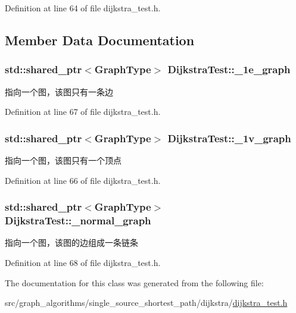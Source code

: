 Definition at line 64 of file dijkstra\+\_\+test.\+h.



\subsection{Member Data Documentation}
\hypertarget{class_dijkstra_test_ac99e2d7d0096e66a7abf7f1275b3a39a}{}
\subsubsection[{\+\_\+1e\+\_\+graph}]{\setlength{\rightskip}{0pt plus 5cm}std\+::shared\+\_\+ptr$<${\bf Graph\+Type}$>$ Dijkstra\+Test\+::\+\_\+1e\+\_\+graph\hspace{0.3cm}{\ttfamily [protected]}}\label{class_dijkstra_test_ac99e2d7d0096e66a7abf7f1275b3a39a}
指向一个图，该图只有一条边 

Definition at line 67 of file dijkstra\+\_\+test.\+h.

\hypertarget{class_dijkstra_test_ad7c2ba728d52c2265fd629da2c9a383c}{}
\subsubsection[{\+\_\+1v\+\_\+graph}]{\setlength{\rightskip}{0pt plus 5cm}std\+::shared\+\_\+ptr$<${\bf Graph\+Type}$>$ Dijkstra\+Test\+::\+\_\+1v\+\_\+graph\hspace{0.3cm}{\ttfamily [protected]}}\label{class_dijkstra_test_ad7c2ba728d52c2265fd629da2c9a383c}
指向一个图，该图只有一个顶点 

Definition at line 66 of file dijkstra\+\_\+test.\+h.

\hypertarget{class_dijkstra_test_a7cdee342c58a60c71e394fd4c4ebfb94}{}
\subsubsection[{\+\_\+normal\+\_\+graph}]{\setlength{\rightskip}{0pt plus 5cm}std\+::shared\+\_\+ptr$<${\bf Graph\+Type}$>$ Dijkstra\+Test\+::\+\_\+normal\+\_\+graph\hspace{0.3cm}{\ttfamily [protected]}}\label{class_dijkstra_test_a7cdee342c58a60c71e394fd4c4ebfb94}
指向一个图，该图的边组成一条链条 

Definition at line 68 of file dijkstra\+\_\+test.\+h.



The documentation for this class was generated from the following file\+:\begin{DoxyCompactItemize}
\item 
src/graph\+\_\+algorithms/single\+\_\+source\+\_\+shortest\+\_\+path/dijkstra/\hyperlink{dijkstra__test_8h}{dijkstra\+\_\+test.\+h}\end{DoxyCompactItemize}
